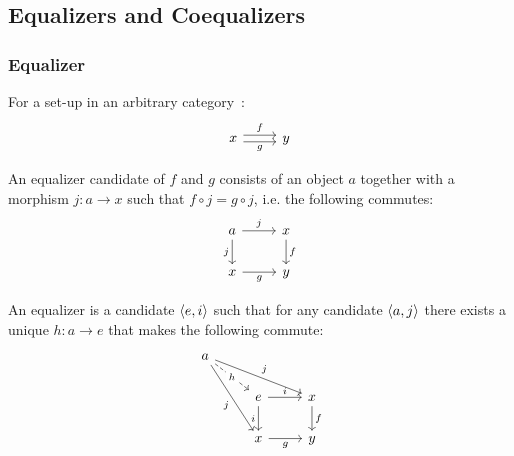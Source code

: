 \subsection{Equalizers and Coequalizers}

\subsubsection*{Equalizer}

\begin{definition}
  For a set-up in an arbitrary
  category~\parencite[p.~112]{leinster:basic_category_theory}:
  \[\begin{tikzcd}[ampersand replacement=\&]
    x \& y
    \arrow["f", shift left=1, from=1-1, to=1-2]
    \arrow["g"', shift right=1, from=1-1, to=1-2]
  \end{tikzcd}\]

  An equalizer candidate of $f$ and $g$ consists of an object $a$ together with
  a morphism $j:a\to x$ such that $f\circ j = g\circ j$, i.e. the following commutes:
  \[\begin{tikzcd}[ampersand replacement=\&]
    a \& x \\
    x \& y
    \arrow["f", from=1-2, to=2-2]
    \arrow["g"', from=2-1, to=2-2]
    \arrow["j"', from=1-1, to=2-1]
    \arrow["j", from=1-1, to=1-2]
  \end{tikzcd}\]

  An equalizer is a candidate $\langle e, i\rangle$ such that for any candidate $\langle a, j\rangle$
  there exists a unique $h:a\to e$ that makes the following commute:
  \[\begin{tikzcd}[ampersand replacement=\&]
    a \\
    \& e \& x \\
    \& x \& y
    \arrow["i"', from=2-2, to=3-2]
    \arrow["i", from=2-2, to=2-3]
    \arrow["f", from=2-3, to=3-3]
    \arrow["g"', from=3-2, to=3-3]
    \arrow["j"', from=1-1, to=3-2]
    \arrow["j", from=1-1, to=2-3]
    \arrow["h"{description}, dashed, from=1-1, to=2-2]
  \end{tikzcd}\]
\end{definition}

